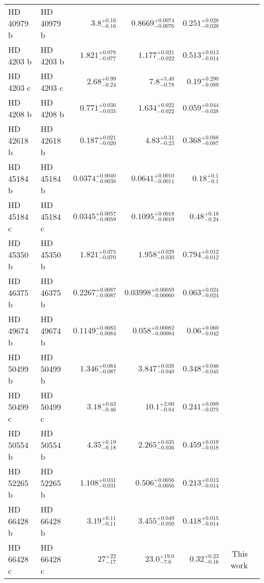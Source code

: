 \begin{longtable*}{llrrrrr}
HD 40979 b & HD 40979 b & $3.8^{+0.16}_{-0.16}$ & $0.8669^{+0.0074}_{-0.0076}$ & $0.251^{+0.028}_{-0.028}$ & \cite{Butler06} & \\
HD 4203 b & HD 4203 b & $1.821^{+0.078}_{-0.077}$ & $1.177^{+0.021}_{-0.022}$ & $0.513^{+0.013}_{-0.014}$ & \cite{Vogt02} & \\
HD 4203 c & HD 4203 c & $2.68^{+0.99}_{-0.24}$ & $7.8^{+5.40}_{-0.78}$ & $0.19^{+0.290}_{-0.089}$ & \cite{Kane14} & \\
HD 4208 b & HD 4208 b & $0.771^{+0.036}_{-0.035}$ & $1.634^{+0.022}_{-0.022}$ & $0.059^{+0.044}_{-0.038}$ & \cite{Vogt02} & \\
HD 42618 b & HD 42618 b & $0.187^{+0.021}_{-0.020}$ & $4.83^{+0.31}_{-0.23}$ & $0.368^{+0.088}_{-0.087}$ & \cite{Fulton16} & \\
HD 45184 b & HD 45184 b & $0.0374^{+0.0040}_{-0.0038}$ & $0.0641^{+0.0010}_{-0.0011}$ & $0.18^{+0.1}_{-0.1}$ & \cite{Udry19} & \\
HD 45184 c & HD 45184 c & $0.0345^{+0.0057}_{-0.0059}$ & $0.1095^{+0.0018}_{-0.0019}$ & $0.48^{+0.18}_{-0.24}$ & \cite{Udry19} & \\
HD 45350 b & HD 45350 b & $1.821^{+0.075}_{-0.070}$ & $1.958^{+0.029}_{-0.030}$ & $0.794^{+0.012}_{-0.012}$ & \cite{Marcy05} & \\
HD 46375 b & HD 46375 b & $0.2267^{+0.0087}_{-0.0087}$ & $0.03998^{+0.00059}_{-0.00060}$ & $0.063^{+0.024}_{-0.024}$ & \cite{Marcy00} & \\
HD 49674 b & HD 49674 b & $0.1149^{+0.0083}_{-0.0084}$ & $0.058^{+0.00082}_{-0.00084}$ & $0.06^{+0.060}_{-0.042}$ & \cite{Butler03} & \\
HD 50499 b & HD 50499 b & $1.346^{+0.084}_{-0.087}$ & $3.847^{+0.038}_{-0.040}$ & $0.348^{+0.046}_{-0.045}$ & \cite{Vogt05} & \\
HD 50499 c & HD 50499 c & $3.18^{+0.63}_{-0.46}$ & $10.1^{+2.00}_{-0.84}$ & $0.241^{+0.089}_{-0.075}$ & \cite{Rickman19} & \\
HD 50554 b & HD 50554 b & $4.35^{+0.19}_{-0.18}$ & $2.265^{+0.035}_{-0.036}$ & $0.459^{+0.019}_{-0.018}$ & \cite{Fischer02} & \\
HD 52265 b & HD 52265 b & $1.108^{+0.031}_{-0.031}$ & $0.506^{+0.0056}_{-0.0056}$ & $0.213^{+0.013}_{-0.014}$ & \cite{Butler00} & \\
HD 66428 b & HD 66428 b & $3.19^{+0.11}_{-0.11}$ & $3.455^{+0.049}_{-0.050}$ & $0.418^{+0.015}_{-0.014}$ & \cite{Butler06} & \\
HD 66428 c & HD 66428 c & $27^{+22}_{-17}$ & $23.0^{+19.0}_{-7.6}$ & $0.32^{+0.23}_{-0.16}$ & This work & \\

\end{longtable*}
